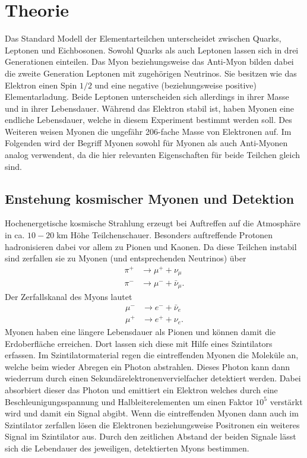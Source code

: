 \section{Theorie}
Das Standard Modell der Elementarteilchen unterscheidet zwischen Quarks, Leptonen und Eichbosonen.
Sowohl Quarks als auch Leptonen lassen sich in drei Generationen einteilen.
Das Myon beziehungsweise das Anti-Myon
bilden dabei die zweite Generation Leptonen mit zugehörigen Neutrinos. Sie besitzen wie das Elektron 
einen Spin $1/2$ und eine negative (beziehungsweise positive) Elementarladung. Beide Leptonen unterscheiden sich allerdings in ihrer Masse 
und in ihrer Lebensdauer. Während das Elektron stabil ist, haben Myonen eine endliche Lebensdauer, welche in diesem 
Experiment bestimmt werden soll. Des Weiteren weisen Myonen die ungefähr 206-fache Masse von Elektronen auf.
Im Folgenden wird der Begriff Myonen sowohl für Myonen als auch Anti-Myonen analog verwendent, da die hier 
relevanten Eigenschaften für beide Teilchen gleich sind.

\subsection{Enstehung kosmischer Myonen und Detektion}
Hochenergetische kosmische Strahlung erzeugt bei Auftreffen auf die Atmosphäre in ca. $10-20\;$km Höhe
Teilchenschauer. Besonders auftreffende Protonen hadronisieren dabei vor allem zu Pionen und Kaonen.
Da diese Teilchen instabil sind zerfallen sie zu Myonen (und entsprechenden Neutrinos) über
\begin{align*}
    \pi^{+} &\to \mu^{+} + \nu_{\mu} \\
    \pi^{-} &\to \mu^{-} + \bar{\nu}_{\mu}.
\end{align*}
Der Zerfallskanal des Myons lautet
\begin{align*}
    \mu^{-} &\to e^{-} + \bar{\nu}_{e} \\
    \mu^{+} &\to e^{+} + \nu_{e}.
\end{align*}
Myonen haben eine längere Lebensdauer als Pionen und können damit die Erdoberfläche erreichen.
Dort lassen sich diese mit Hilfe eines Szintilators erfassen. Im Szintilatormaterial regen die eintreffenden
Myonen die Moleküle an, welche beim wieder Abregen ein Photon abstrahlen. Dieses Photon kann dann wiederrum 
durch einen Sekundärelektronenvervielfacher detektiert werden. Dabei absorbiert dieser das Photon und emittiert
ein Elektron welches durch eine Beschleunigungsspannung und Halbleiterelementen um einen Faktor $10^5$ verstärkt wird
und damit ein Signal abgibt.
Wenn die eintreffenden Myonen dann auch im Szintilator zerfallen lösen die Elektronen beziehungsweise Positronen 
ein weiteres Signal im Szintilator aus. Durch den zeitlichen Abstand der beiden Signale lässt sich 
die Lebendauer des jeweiligen, detektierten Myons bestimmen.

